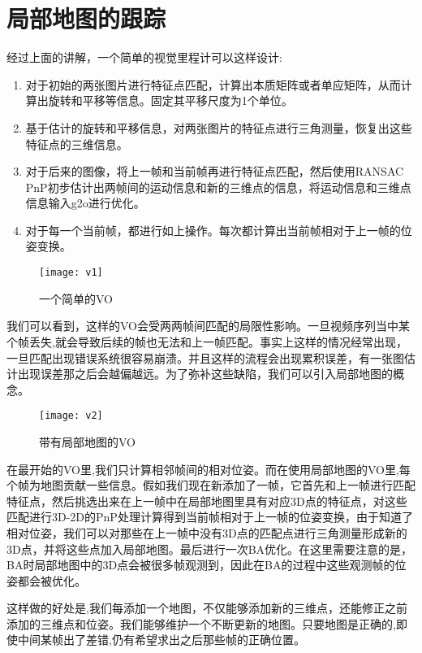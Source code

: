 \section{局部地图的跟踪}
经过上面的讲解，一个简单的视觉里程计可以这样设计:
\begin{enumerate}
	\item 对于初始的两张图片进行特征点匹配，计算出本质矩阵或者单应矩阵，从而计算出旋转和平移等信息。固定其平移尺度为1个单位。
	\item 基于估计的旋转和平移信息，对两张图片的特征点进行三角测量，恢复出这些特征点的三维信息。
	\item 对于后来的图像，将上一帧和当前帧再进行特征点匹配，然后使用RANSAC PnP初步估计出两帧间的运动信息和新的三维点的信息，将运动信息和三维点信息输入g2o进行优化。
	\item 对于每一个当前帧，都进行如上操作。每次都计算出当前帧相对于上一帧的位姿变换。
\end{enumerate}
\begin{figure}[H]
	\centering
	\texttt{[image: v1]}
	\caption{一个简单的VO}
\end{figure}
我们可以看到，这样的VO会受两两帧间匹配的局限性影响。一旦视频序列当中某个帧丢失,就会导致后续的帧也无法和上一帧匹配。事实上这样的情况经常出现，一旦匹配出现错误系统很容易崩溃。并且这样的流程会出现累积误差，有一张图估计出现误差那之后会越偏越远。为了弥补这些缺陷，我们可以引入局部地图的概念。\par
\begin{figure}[H]
	\centering
	\texttt{[image: v2]}
	\caption{带有局部地图的VO}
\end{figure}
在最开始的VO里,我们只计算相邻帧间的相对位姿。而在使用局部地图的VO里,每个帧为地图贡献一些信息。假如我们现在新添加了一帧，它首先和上一帧进行匹配特征点，然后挑选出来在上一帧中在局部地图里具有对应3D点的特征点，对这些匹配进行3D-2D的PnP处理计算得到当前帧相对于上一帧的位姿变换，由于知道了相对位姿，我们可以对那些在上一帧中没有3D点的匹配点进行三角测量形成新的3D点，并将这些点加入局部地图。最后进行一次BA优化。在这里需要注意的是，BA时局部地图中的3D点会被很多帧观测到，因此在BA的过程中这些观测帧的位姿都会被优化。\par
这样做的好处是,我们每添加一个地图，不仅能够添加新的三维点，还能修正之前添加的三维点和位姿。我们能够维护一个不断更新的地图。只要地图是正确的,即使中间某帧出了差错,仍有希望求出之后那些帧的正确位置。















